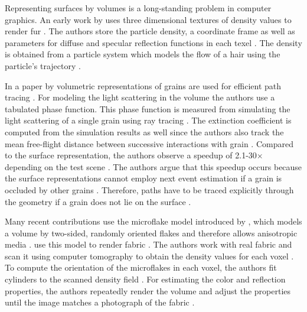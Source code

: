 Representing surfaces by volumes is a long-standing problem in computer graphics.
An early work by \citeauthor{kajiya_rendering_fur_with_textures} uses three dimensional textures of density values to render fur \cite{kajiya_rendering_fur_with_textures}.
The authors store the particle density, a coordinate frame as well as parameters for diffuse and specular reflection functions in each texel \cite{kajiya_rendering_fur_with_textures}.
The density is obtained from a particle system which models the flow of a hair using the particle's trajectory \cite{kajiya_rendering_fur_with_textures}.

In a paper by \citeauthor{meng_multi_scale_modeling_and_rendering_of_granular_materials} volumetric representations of grains are used for efficient path tracing \cite{meng_multi_scale_modeling_and_rendering_of_granular_materials}.
For modeling the light scattering in the volume the authors use a tabulated phase function.
This phase function is measured from simulating the light scattering of a single grain using ray tracing \cite{meng_multi_scale_modeling_and_rendering_of_granular_materials}.
The extinction coefficient is computed from the simulation results as well since the authors also track the mean free-flight distance between successive interactions with grain \cite{meng_multi_scale_modeling_and_rendering_of_granular_materials}.
Compared to the surface representation, the authors observe a speedup of 2.1-30$\times$ depending on the test scene \cite{meng_multi_scale_modeling_and_rendering_of_granular_materials}.
The authors argue that this speedup occurs because the surface representations cannot employ next event estimation if a grain is occluded by other grains \cite{meng_multi_scale_modeling_and_rendering_of_granular_materials}.
Therefore, paths have to be traced explicitly through the geometry if a grain does not lie on the surface \cite{meng_multi_scale_modeling_and_rendering_of_granular_materials}.

Many recent contributions use the microflake model introduced by \citeauthor{microflake}, which models a volume by two-sided, randomly oriented flakes and therefore allows anisotropic media \cite{microflake}.
\citeauthor{zhao_building_volumetric_appearance_models} use this model to render fabric \cite{zhao_building_volumetric_appearance_models}.
The authors work with real fabric and scan it using computer tomography to obtain the density values for each voxel \cite{zhao_building_volumetric_appearance_models}.
To compute the orientation of the microflakes in each voxel, the authors fit cylinders to the scanned density field \cite{zhao_building_volumetric_appearance_models}.
For estimating the color and reflection properties, the authors repeatedly render the volume and adjust the properties until the image matches a photograph of the fabric \cite{zhao_building_volumetric_appearance_models}.

